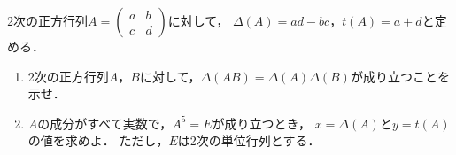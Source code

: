 \documentclass[../../main.tex]{subfiles}
\begin{document}
2次の正方行列$A=
\begin{pmatrix} a & b \\ c & d
\end{pmatrix}$に対して，
$\Delta (A)=ad-bc$，$t(A)=a+d$と定める．
\begin{enumerate}
  \item 2次の正方行列$A$，$B$に対して，$\Delta(AB)=\Delta(A)\Delta(B)$が成り立つことを示せ．
  \item $A$の成分がすべて実数で，$A^5=E$が成り立つとき，
    $x=\Delta(A)$と$y=t(A)$の値を求めよ．
    ただし，$E$は2次の単位行列とする．
\end{enumerate}
\end{document}
